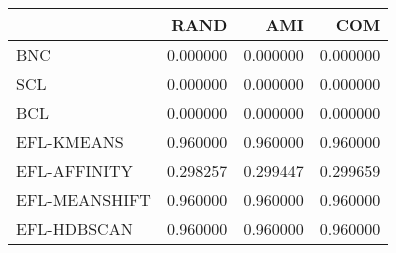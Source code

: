 \begin{tabular}{lrrr}
\toprule
 & RAND & AMI & COM \\
\midrule
BNC & 0.000000 & 0.000000 & 0.000000 \\
SCL & 0.000000 & 0.000000 & 0.000000 \\
BCL & 0.000000 & 0.000000 & 0.000000 \\
EFL-KMEANS & 0.960000 & 0.960000 & 0.960000 \\
EFL-AFFINITY & 0.298257 & 0.299447 & 0.299659 \\
EFL-MEANSHIFT & 0.960000 & 0.960000 & 0.960000 \\
EFL-HDBSCAN & 0.960000 & 0.960000 & 0.960000 \\
\bottomrule
\end{tabular}
